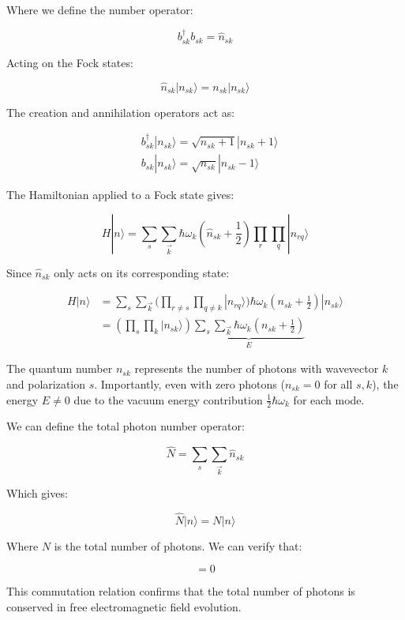 \documentclass[italian]{HKNdocument}
\begin{document}
Where we define the number operator:

\begin{equation}
b_{sk}^\dagger b_{sk}=\hat{n}_{sk} \label{eq:15.22}
\end{equation}

Acting on the Fock states:

\begin{equation}
\hat{n}_{sk}|n_{sk}\rangle=n_{sk}|n_{sk}\rangle \label{eq:15.23}
\end{equation}

The creation and annihilation operators act as:

\begin{align}
&b_{sk}^\dagger|n_{sk}\rangle=\sqrt{n_{sk}+1}|n_{sk}+1\rangle \label{eq:15.24}\\
&b_{sk}|n_{sk}\rangle=\sqrt{n_{sk}}|n_{sk}-1\rangle
\end{align}

The Hamiltonian applied to a Fock state gives:

\begin{equation}
H|n\rangle=\sum_s\sum_{\vec{k}}\hbar\omega_k(\hat{n}_{sk}+\frac{1}{2})\prod_r\prod_q|n_{rq}\rangle \label{eq:15.25}
\end{equation}

Since $\hat{n}_{sk}$ only acts on its corresponding state:

\begin{align}
H|n\rangle&=\sum_s\sum_{\vec{k}}(\prod_{r\neq s}\prod_{q\neq k}|n_{rq}\rangle)\hbar\omega_k(n_{sk}+\frac{1}{2})|n_{sk}\rangle\\
&=(\prod_s\prod_k|n_{sk}\rangle)\underbrace{\sum_s\sum_{\vec{k}}\hbar\omega_k(n_{sk}+\frac{1}{2})}_E \label{eq:15.26}
\end{align}

The quantum number $n_{sk}$ represents the number of photons with wavevector $k$ and polarization $s$. Importantly, even with zero photons ($n_{sk}=0$ for all $s,k$), the energy $E\neq 0$ due to the vacuum energy contribution $\frac{1}{2}\hbar\omega_k$ for each mode.

We can define the total photon number operator:

\begin{equation}
\hat{N}=\sum_s\sum_{\vec{k}}\hat{n}_{sk} \label{eq:15.27}
\end{equation}

Which gives:

\begin{equation}
\hat{N}|n\rangle=N|n\rangle \label{eq:15.28}
\end{equation}

Where $N$ is the total number of photons. We can verify that:

\begin{equation}
[\hat{N},H]=0 \label{eq:15.29}
\end{equation}

This commutation relation confirms that the total number of photons is conserved in free electromagnetic field evolution.

\backmatter

\end{document}
